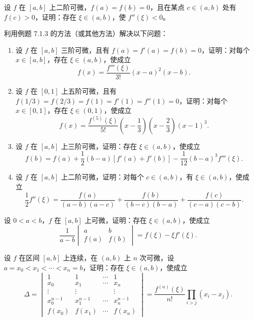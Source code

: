 \begin{xreferenceproblem}[8]
设 $f$ 在 $[a,b]$ 上二阶可微，$f(a)=f(b)=0$，且在某点 $c\in(a,b)$ 处有 $f(c)>0$，证明：存在 $\xi\in(a,b)$，使 $f''(\xi)<0$。
\end{xreferenceproblem}

\begin{xreferenceproblem}[9]
利用例题 7.1.3 的方法（或其他方法）解决以下问题：
\begin{enumerate}[label=(\arabic*)]
  \item 设 $f$ 在 $[a,b]$ 三阶可微，且有 $f(a)=f'(a)=f(b)=0$，证明：对每个 $x\in[a,b]$，存在 $\xi\in(a,b)$，使成立
  \[
    f(x)=\frac{f'''(\xi)}{3!}(x-a)^2(x-b).
  \]
  \item 设 $f$ 在 $[0,1]$ 上五阶可微，且有 $f(1/3)=f(2/3)=f(1)=f'(1)=f''(1)=0$，证明：对每个 $x\in[0,1]$，存在 $\xi\in(0,1)$，使成立
  \[
    f(x)=\frac{f^{(5)}(\xi)}{5!}\left(x-\frac13\right)\left(x-\frac23\right)(x-1)^3.
  \]
  \item 设 $f$ 在 $[a,b]$ 上三阶可微，证明：存在 $\xi\in(a,b)$，使成立
  \[
    f(b)=f(a)+\frac12(b-a)[f'(a)+f'(b)]-\frac{1}{12}(b-a)^3f'''(\xi).
  \]
  \item 设 $f$ 在 $[a,b]$ 上二阶可微，证明：对每个 $c\in(a,b)$，有 $\xi\in(a,b)$，使成立
  \[
    \frac12f''(\xi)
    =\frac{f(a)}{(a-b)(a-c)}
    +\frac{f(b)}{(b-c)(b-a)}
    +\frac{f(c)}{(c-a)(c-b)}.
  \]
\end{enumerate}
\end{xreferenceproblem}

\begin{xreferenceproblem}[10]
设 $0<a<b$，$f$ 在 $[a,b]$ 上可微，证明：存在 $\xi\in(a,b)$，使成立
\[
  \frac{1}{a-b}
  \begin{vmatrix}
    a&b\\
    f(a)&f(b)
  \end{vmatrix}
  =f(\xi)-\xi f'(\xi).
\]
\end{xreferenceproblem}

\begin{xreferenceproblem}[11]
设 $f$ 在区间 $[a,b]$ 上连续，在 $(a,b)$ 上 $n$ 次可微，设 $a=x_0<x_1<\cdots<x_n=b$，证明：存在 $\xi\in(a,b)$，使成立
\[
  \Delta=
  \begin{vmatrix}
    1&1&\cdots&1\\
    x_0&x_1&\cdots&x_n\\
    \vdots&\vdots&&\vdots\\
    x_0^{n-1}&x_1^{n-1}&\cdots&x_n^{n-1}\\
    f(x_0)&f(x_1)&\cdots&f(x_n)
  \end{vmatrix}
  =\frac{f^{(n)}(\xi)}{n!}\prod_{i>j}(x_i-x_j).
\]
\end{xreferenceproblem}

